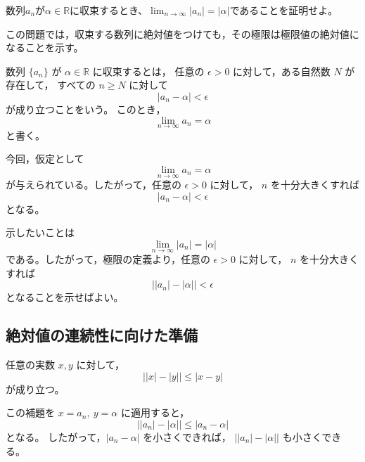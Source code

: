 \begin{exercise}
	数列${a_n}$が$\alpha\in\mathbb{R}$に収束するとき、$\lim_{n\rightarrow\infty}|a_n|=|\alpha|$であることを証明せよ。
\end{exercise}

\begin{background}
	この問題では，収束する数列に絶対値をつけても，その極限は極限値の絶対値になることを示す。

	\begin{definition}[数列の収束]
		数列 $\{a_n\}$ が $\alpha\in\mathbb{R}$ に収束するとは，
		任意の $\epsilon>0$ に対して，ある自然数 $N$ が存在して，
		すべての $n\geq N$ に対して
		\[
			|a_n-\alpha|<\epsilon
		\]
		が成り立つことをいう。
		このとき，
		\[
			\lim_{n\to\infty}a_n=\alpha
		\]
		と書く。
	\end{definition}

	\begin{remark}
		今回，仮定として
		\[
			\lim_{n\to\infty}a_n=\alpha
		\]
		が与えられている。したがって，任意の $\epsilon>0$ に対して，
		$n$ を十分大きくすれば
		\[
			|a_n-\alpha|<\epsilon
		\]
		となる。
	\end{remark}

	\begin{remark}
		示したいことは
		\[
			\lim_{n\to\infty}|a_n|=|\alpha|
		\]
		である。したがって，極限の定義より，任意の $\epsilon>0$ に対して，
		$n$ を十分大きくすれば
		\[
			\bigl||a_n|-|\alpha|\bigr|<\epsilon
		\]
		となることを示せばよい。
	\end{remark}

	\subsection{絶対値の連続性に向けた準備}

	\begin{lemma}[逆三角不等式]
		任意の実数 $x,y$ に対して，
		\[
			\bigl||x|-|y|\bigr|\leq |x-y|
		\]
		が成り立つ。
	\end{lemma}

	\begin{remark}
		この補題を $x=a_n,\ y=\alpha$ に適用すると，
		\[
			\bigl||a_n|-|\alpha|\bigr|
			\leq |a_n-\alpha|
		\]
		となる。
		したがって，$|a_n-\alpha|$ を小さくできれば，
		$\bigl||a_n|-|\alpha|\bigr|$ も小さくできる。
	\end{remark}
\end{background}

